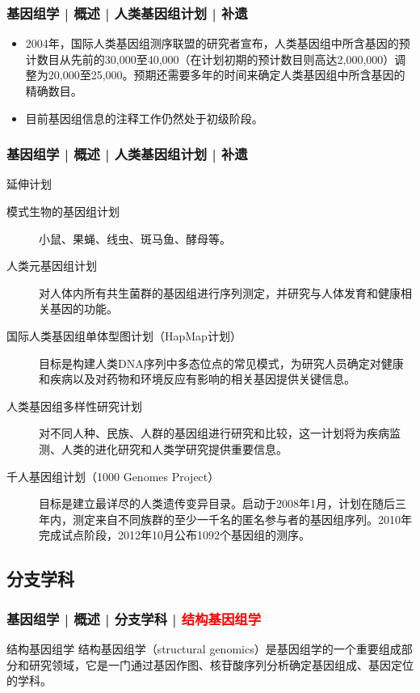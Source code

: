 \begin{frame}
  \frametitle{基因组学 | 概述 | 人类基因组计划 | 补遗}
  \begin{itemize}
    \item 2004年，国际人类基因组测序联盟的研究者宣布，人类基因组中所含基因的预计数目从先前的30,000至40,000（在计划初期的预计数目则高达2,000,000）调整为20,000至25,000。预期还需要多年的时间来确定人类基因组中所含基因的精确数目。
    \item 目前基因组信息的注释工作仍然处于初级阶段。
  \end{itemize}
\end{frame}

\begin{frame}
  \frametitle{基因组学 | 概述 | 人类基因组计划 | 补遗}
  \begin{block}{延伸计划}
    \begin{description}
      \item[模式生物的基因组计划] 小鼠、果蝇、线虫、斑马鱼、酵母等。
      \item[人类元基因组计划] 对人体内所有共生菌群的基因组进行序列测定，并研究与人体发育和健康相关基因的功能。
      \item[国际人类基因组单体型图计划（HapMap计划）] 目标是构建人类DNA序列中多态位点的常见模式，为研究人员确定对健康和疾病以及对药物和环境反应有影响的相关基因提供关键信息。 
      \item[人类基因组多样性研究计划] 对不同人种、民族、人群的基因组进行研究和比较，这一计划将为疾病监测、人类的进化研究和人类学研究提供重要信息。
      \item[千人基因组计划（1000 Genomes Project）] 目标是建立最详尽的人类遗传变异目录。启动于2008年1月，计划在随后三年内，测定来自不同族群的至少一千名的匿名参与者的基因组序列。2010年完成试点阶段，2012年10月公布1092个基因组的测序。
    \end{description}
  \end{block}
\end{frame}

\subsection{分支学科}
\begin{frame}
  \frametitle{基因组学 | 概述 | 分支学科 | \textcolor{red}{结构基因组学}}
  \begin{block}{结构基因组学}
结构基因组学（structural genomics）是基因组学的一个重要组成部分和研究领域，它是一门通过基因作图、核苷酸序列分析确定基因组成、基因定位的学科。
  \end{block}
\end{frame}

